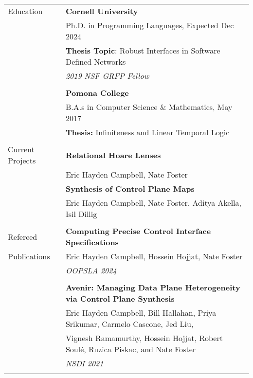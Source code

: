 \documentclass[letterpaper,10pt,oneside]{article}
\begin{document}
\noindent
\begin{tabular}{@{} l l}
  \Large{Education} 
  & \textbf{Cornell University} \\
  & Ph.D. in Programming Languages, Expected Dec 2024 \\
  & \textbf{Thesis Topic}: Robust Interfaces in Software Defined Networks \\
  & \textit{2019 NSF GRFP Fellow} \\
  \\

  & \textbf{Pomona College} \\
  & B.A.s in Computer Science \& Mathematics, May 2017 \\
  & \textbf{Thesis:} Infiniteness and Linear Temporal Logic \\
  & \\



  \Large{Current Projects}
  & \textbf{Relational Hoare Lenses}\\
  & Eric Hayden Campbell, Nate Foster \\
  & \textbf{Synthesis of Control Plane Maps} \\
  & Eric Hayden Campbell, Nate Foster, Aditya Akella, Isil Dillig \\
  & \\

  \Large{Refereed}
  & \textbf{Computing Precise Control Interface Specifications} \\
  \Large{Publications}
  & Eric Hayden Campbell, Hossein Hojjat, Nate Foster \\
  & \textit{OOPSLA 2024} \\
  & \\

  & \textbf{Avenir: Managing Data Plane Heterogeneity via Control Plane Synthesis}\\
  & Eric Hayden Campbell, Bill Hallahan, Priya Srikumar, Carmelo Cascone, Jed Liu, \\ & Vignesh Ramamurthy, Hossein Hojjat, Robert  Soul\'{e}, Ruzica Piskac,  and  Nate Foster\\
  & \textit{NSDI 2021} \\
  &\\


\end{tabular}
\end{document}
